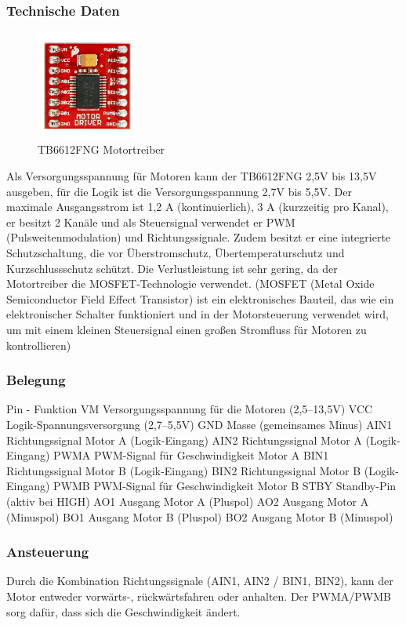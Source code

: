 \subsubsection{Technische Daten}
\begin{figure}[H]
    \centering
    \includegraphics[width=0.3\textwidth]{img/Hardware/Motortreiber.png}
    \caption{TB6612FNG Motortreiber}
    \label{fig:motortreiber}
\end{figure}
Als Versorgungsspannung für Motoren kann der TB6612FNG 2,5V bis 13,5V ausgeben, für die Logik ist die Versorgungsspannung 2,7V bis 5,5V. 
Der maximale Ausgangsstrom ist 1,2 A (kontinuierlich), 3 A (kurzzeitig pro Kanal), er besitzt 2 Kanäle und als Steuersignal verwendet er PWM (Pulsweitenmodulation) und Richtungssignale. 
Zudem besitzt er eine integrierte Schutzschaltung, die vor Überstromschutz, Übertemperaturschutz und Kurzschlussschutz schützt. 
Die Verlustleistung ist sehr gering, da der Motortreiber die MOSFET-Technologie verwendet. (MOSFET (Metal Oxide Semiconductor Field Effect Transistor) ist ein elektronisches Bauteil, 
das wie ein elektronischer Schalter funktioniert und in der Motorsteuerung verwendet wird, um mit einem kleinen Steuersignal einen großen Stromfluss für Motoren zu kontrollieren)
\subsubsection{Belegung}
Pin	-	Funktion
VM	Versorgungsspannung für die Motoren (2,5–13,5V)
VCC	Logik-Spannungsversorgung (2,7–5,5V)
GND	Masse (gemeinsames Minus)
AIN1	Richtungssignal Motor A (Logik-Eingang)
AIN2	Richtungssignal Motor A (Logik-Eingang)
PWMA	PWM-Signal für Geschwindigkeit Motor A
BIN1	Richtungssignal Motor B (Logik-Eingang)
BIN2	Richtungssignal Motor B (Logik-Eingang)
PWMB	PWM-Signal für Geschwindigkeit Motor B
STBY	Standby-Pin (aktiv bei HIGH)
AO1	Ausgang Motor A (Pluspol)
AO2	Ausgang Motor A (Minuspol)
BO1	Ausgang Motor B (Pluspol)
BO2	Ausgang Motor B (Minuspol)

\subsubsection{Ansteuerung}
Durch die Kombination Richtungssignale (AIN1, AIN2 / BIN1, BIN2), kann der Motor entweder vorwärts-, rückwärtsfahren oder anhalten.
Der PWMA/PWMB sorg dafür, dass sich die Geschwindigkeit ändert.
%
